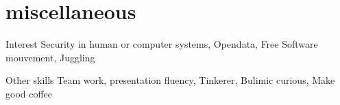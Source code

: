 \documentclass[]{friggeri-cv} %
\begin{document}

\section{miscellaneous}

\begin{entrylist}
\entry
{Interest}{}{}
{Security in human or computer systems, Opendata, Free Software mouvement, Juggling}

\entry
{Other skills}{}{}
{Team work, presentation fluency, Tinkerer, Bulimic curious, Make good coffee}

\end{entrylist}
\end{document}
